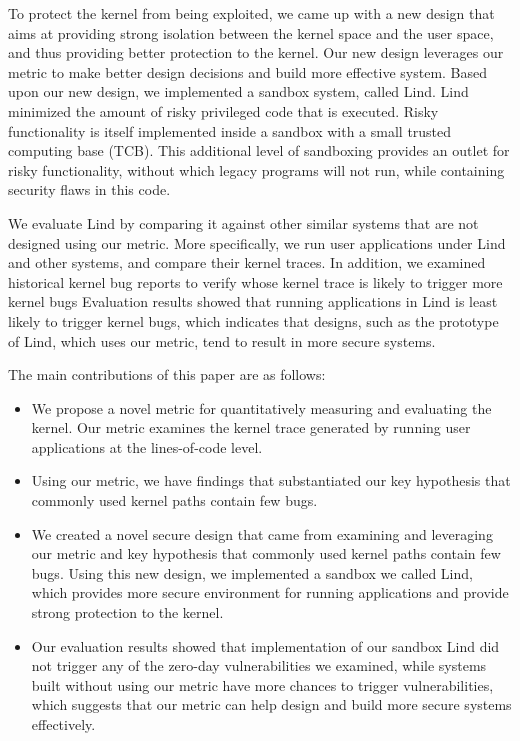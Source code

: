 To protect the kernel from being exploited, we came up with a new design 
that aims at providing strong isolation between the kernel space and the user space, 
and thus providing better protection to the kernel. Our new design leverages 
our metric to make better design decisions and build more effective system. 
Based upon our new design, we implemented a sandbox system, called Lind.
Lind minimized the amount of risky privileged code that is executed.  
Risky functionality is itself implemented inside a sandbox with
a small trusted computing base (TCB). 
This additional level of sandboxing provides an outlet for risky functionality, without which
legacy programs will not run, while containing security flaws in this code. 

We evaluate Lind by comparing it against other similar systems 
that are not designed using our metric. More specifically, we run user applications
under Lind and other systems, and compare their kernel traces. In addition, we examined historical
kernel bug reports to verify whose kernel trace is likely to trigger more kernel bugs
Evaluation results showed that running applications in Lind is least likely to trigger kernel bugs, 
which indicates that designs, such as the prototype of Lind, which uses our metric, 
tend to result in more secure systems. 

The main contributions of this paper are as follows:

\begin{itemize}
\item We propose a novel metric for quantitatively measuring and evaluating the kernel. 
Our metric examines the kernel trace generated by running user applications at the lines-of-code level.  

\item Using our metric, we have findings that substantiated our key hypothesis that commonly used kernel paths 
contain few bugs. 

\item We created a novel secure design that came from examining and leveraging our metric and key hypothesis 
that commonly used kernel paths contain few bugs. 
Using this new design, we implemented a sandbox we called Lind, which provides more secure environment
for running applications and provide strong protection to the kernel. 

\item Our evaluation results showed that implementation of our sandbox Lind did not trigger any of the 
zero-day vulnerabilities we examined, 
while systems built without using our metric have more chances to trigger vulnerabilities, which suggests 
that our metric can help design and build more secure systems effectively.
\end{itemize}

